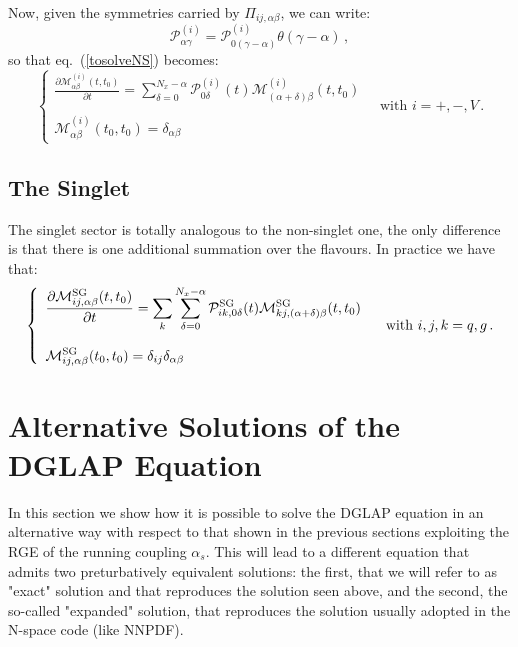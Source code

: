 \documentclass[10pt,a4paper]{article}
\begin{document}
Now, given the symmetries carried by $\Pi_{ij,\alpha\beta}$, we can write:
\begin{equation}
\mathcal{P}_{\alpha\gamma}^{(i)} = \mathcal{P}_{0(\gamma-\alpha)}^{(i)}\theta(\gamma-\alpha)\,,
\end{equation}
so that eq.~(\ref{tosolveNS}) becomes:
\begin{equation}
\left\{\begin{array}{l}
\displaystyle \frac{\partial  \mathcal{M}_{\alpha\beta}^{(i)}(t,t_0)}{\partial t}= \sum_{\delta=0}^{N_x-\alpha} \mathcal{P}_{0\delta}^{(i)}(t)\mathcal{M}_{(\alpha+\delta)\beta}^{(i)}(t,t_0)\\
\\
\displaystyle \mathcal{M}_{\alpha\beta}^{(i)}(t_0,t_0)=\delta_{\alpha\beta}
\end{array}\right.\quad\mbox{with } i=+,-,V\,.
\label{tosolveNS1}
\end{equation}

\subsection{The Singlet}

The singlet sector is totally analogous to the non-singlet one, the only difference is that there is one additional summation over the flavours. In practice we have that:
\begin{equation}
\left\{\begin{array}{l}
\displaystyle \frac{\partial  \mathcal{M}_{ij,\alpha\beta}^{\rm SG}(t,t_0)}{\partial t}= \sum_k \sum_{\delta=0}^{N_x-\alpha} \mathcal{P}_{ik,0\delta}^{\rm SG}(t)\mathcal{M}_{kj,(\alpha+\delta)\beta}^{\rm SG}(t,t_0)\\
\\
\displaystyle \mathcal{M}_{ij,\alpha\beta}^{\rm SG}(t_0,t_0)=\delta_{ij}\delta_{\alpha\beta}
\end{array}\right.\quad\mbox{with }i,j,k=q,g\,.
\label{tosolveSG}
\end{equation}

\section{Alternative Solutions of the DGLAP Equation}

In this section we show how it is possible to solve the DGLAP equation
in an alternative way with respect to that shown in the previous
sections exploiting the RGE of the running coupling $\alpha_s$. This
will lead to a different equation that admits two preturbatively
equivalent solutions: the first, that we will refer to as "exact"
solution and that reproduces the solution seen above, and the second, the
so-called "expanded" solution, that reproduces the solution usually
adopted in the N-space code (like NNPDF). 
\end{document}

